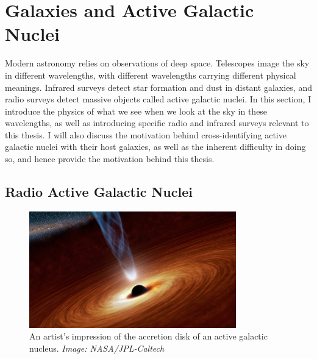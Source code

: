 \chapter{Galaxies and Active Galactic Nuclei}
\label{cha:astro}

    Modern astronomy relies on observations of deep space. Telescopes image the
    sky in different wavelengths, with different wavelengths carrying different
    physical meanings. Infrared surveys detect star formation and dust in
    distant galaxies, and radio surveys detect massive objects called active
    galactic nuclei. In this section, I introduce the physics of what we see
    when we look at the sky in these wavelengths, as well as introducing
    specific radio and infrared surveys relevant to this thesis. I will also
    discuss the motivation behind cross-identifying active galactic nuclei with
    their host galaxies, as well as the inherent difficulty in doing so, and
    hence provide the motivation behind this thesis.




    \section{Radio Active Galactic Nuclei}

        \begin{figure}[!ht]
            \centering
            \includegraphics[width=0.8\textwidth]{images/accretion_disk_artist_impression.jpg}
            \caption{An artist's impression of the accretion disk of an active galactic nucleus. \emph{Image: NASA/JPL-Caltech}}
            \label{fig:accretion-disk}
        \end{figure}

